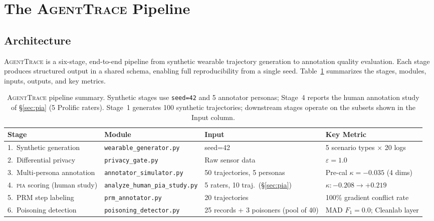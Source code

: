 \documentclass{article}
\newcommand{\PIA}{\textsc{pia}}          %
\newcommand{\AgentTrace}{\textsc{AgentTrace}}
\begin{document}
\section{The \AgentTrace{} Pipeline}
\label{sec:agenttrace}

\subsection{Architecture}
\label{sec:agenttrace:arch}

\AgentTrace{} is a six-stage, end-to-end pipeline from synthetic wearable
trajectory generation to annotation quality evaluation.
%
Each stage produces structured output in a shared schema, enabling full
reproducibility from a single seed.
%
Table~\ref{tab:pipeline} summarizes the stages, modules, inputs, outputs,
and key metrics.

\begin{table}[!t]
\centering
\caption{\AgentTrace{} pipeline summary. Synthetic stages use
         \texttt{seed=42} and 5 annotator personas; Stage~4 reports the human
         annotation study of \S\ref{sec:pia} (5 Prolific raters). Stage~1
         generates 100 synthetic trajectories; downstream stages operate on
         the subsets shown in the Input column.}
\label{tab:pipeline}
\small
\begin{tabular}{p{2.8cm}p{2.5cm}p{1.5cm}p{1.8cm}}
\toprule
\textbf{Stage} & \textbf{Module} & \textbf{Input} & \textbf{Key Metric} \\
\midrule
1.\ Synthetic generation
  & \texttt{wearable\_generator.py}
  & seed=42
  & 5 scenario types $\times$ 20 logs \\
2.\ Differential privacy
  & \texttt{privacy\_gate.py}
  & Raw sensor data
  & $\varepsilon=1.0$ \\
3.\ Multi-persona annotation
  & \texttt{annotator\_simulator.py}
  & 50 trajectories, 5 personas
  & Pre-cal $\kappa = -0.035$ (4 dims) \\
4.\ \PIA{} scoring (human study)
  & \texttt{analyze\_human}\newline\texttt{\_pia\_study.py}
  & 5 raters, 10 traj.\ (\S\ref{sec:pia})
  & $\kappa\colon{-0.208} \to {+0.219}$ \\
5.\ PRM step labeling
  & \texttt{prm\_annotator.py}
  & 20 trajectories
  & 100\% gradient conflict rate \\
6.\ Poisoning detection
  & \texttt{poisoning\_detector.py}
  & 25 records + 3 poisoners (pool of 40)
  & MAD $F_1=0.0$; Cleanlab layer \\
\bottomrule
\end{tabular}
\end{table}
\end{document}
